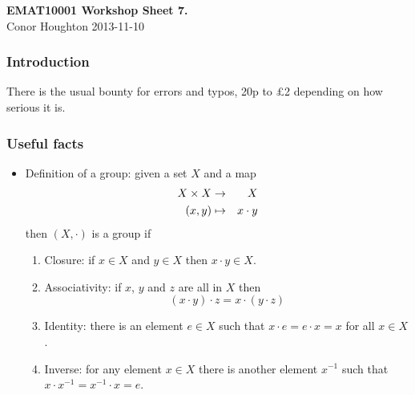 \documentclass[12pt]{article}
\begin{document}
\begin{center}
{\bf EMAT10001 Workshop Sheet 7.}\\[1cm]{} Conor Houghton 2013-11-10
\end{center}
\subsubsection*{Introduction} 
There is the usual bounty for errors and typos, 20p to \pounds 2
depending on how serious it is.

\subsubsection*{Useful facts}
\begin{itemize}
\item Definition of a group: given a set $X$ and a map
\begin{eqnarray}
X\times X&\rightarrow& X\cr
(x,y)&\mapsto& x\cdot y
\end{eqnarray}
then $(X,\cdot)$ is a group if
\begin{enumerate}
\item Closure: if $x\in X$ and $y\in X$ then $x\cdot y\in X$.
\item Associativity: if $x$, $y$ and $z$ are all in $X$ then 
\begin{equation}
(x\cdot y)\cdot z=x\cdot(y\cdot z)
\end{equation}
\item Identity: there is an element $e\in X$ such that $x\cdot e=e\cdot x=x$ for all $x\in X$.
\item Inverse: for any element $x\in X$ there is another element
  $x^{-1}$ such that $x\cdot x^{-1}=x^{-1}\cdot x=e$.
\end{enumerate}
\end{itemize}
\end{document}
